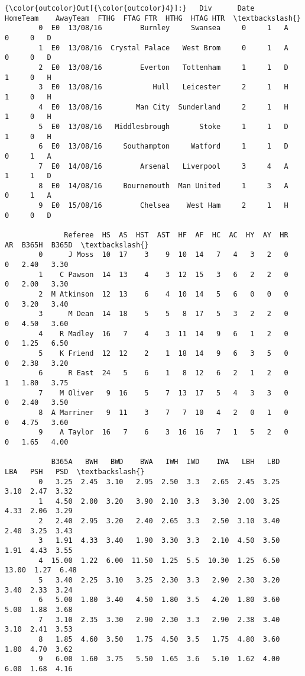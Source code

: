 \documentclass[11pt]{article}
\begin{document}
\begin{Verbatim}[commandchars=\\\{\}]
{\color{outcolor}Out[{\color{outcolor}4}]:}   Div      Date        HomeTeam    AwayTeam  FTHG  FTAG FTR  HTHG  HTAG HTR  \textbackslash{}
        0  E0  13/08/16         Burnley     Swansea     0     1   A     0     0   D   
        1  E0  13/08/16  Crystal Palace   West Brom     0     1   A     0     0   D   
        2  E0  13/08/16         Everton   Tottenham     1     1   D     1     0   H   
        3  E0  13/08/16            Hull   Leicester     2     1   H     1     0   H   
        4  E0  13/08/16        Man City  Sunderland     2     1   H     1     0   H   
        5  E0  13/08/16   Middlesbrough       Stoke     1     1   D     1     0   H   
        6  E0  13/08/16     Southampton     Watford     1     1   D     0     1   A   
        7  E0  14/08/16         Arsenal   Liverpool     3     4   A     1     1   D   
        8  E0  14/08/16     Bournemouth  Man United     1     3   A     0     1   A   
        9  E0  15/08/16         Chelsea    West Ham     2     1   H     0     0   D   
        
              Referee  HS  AS  HST  AST  HF  AF  HC  AC  HY  AY  HR  AR  B365H  B365D  \textbackslash{}
        0      J Moss  10  17    3    9  10  14   7   4   3   2   0   0   2.40   3.30   
        1    C Pawson  14  13    4    3  12  15   3   6   2   2   0   0   2.00   3.30   
        2  M Atkinson  12  13    6    4  10  14   5   6   0   0   0   0   3.20   3.40   
        3      M Dean  14  18    5    5   8  17   5   3   2   2   0   0   4.50   3.60   
        4    R Madley  16   7    4    3  11  14   9   6   1   2   0   0   1.25   6.50   
        5    K Friend  12  12    2    1  18  14   9   6   3   5   0   0   2.38   3.20   
        6      R East  24   5    6    1   8  12   6   2   1   2   0   1   1.80   3.75   
        7    M Oliver   9  16    5    7  13  17   5   4   3   3   0   0   2.40   3.50   
        8  A Marriner   9  11    3    7   7  10   4   2   0   1   0   0   4.75   3.60   
        9    A Taylor  16   7    6    3  16  16   7   1   5   2   0   0   1.65   4.00   
        
           B365A   BWH   BWD    BWA   IWH  IWD    IWA   LBH   LBD    LBA   PSH   PSD  \textbackslash{}
        0   3.25  2.45  3.10   2.95  2.50  3.3   2.65  2.45  3.25   3.10  2.47  3.32   
        1   4.50  2.00  3.20   3.90  2.10  3.3   3.30  2.00  3.25   4.33  2.06  3.29   
        2   2.40  2.95  3.20   2.40  2.65  3.3   2.50  3.10  3.40   2.40  3.25  3.43   
        3   1.91  4.33  3.40   1.90  3.30  3.3   2.10  4.50  3.50   1.91  4.43  3.55   
        4  15.00  1.22  6.00  11.50  1.25  5.5  10.30  1.25  6.50  13.00  1.27  6.48   
        5   3.40  2.25  3.10   3.25  2.30  3.3   2.90  2.30  3.20   3.40  2.33  3.24   
        6   5.00  1.80  3.40   4.50  1.80  3.5   4.20  1.80  3.60   5.00  1.88  3.68   
        7   3.10  2.35  3.30   2.90  2.30  3.3   2.90  2.38  3.40   3.10  2.41  3.53   
        8   1.85  4.60  3.50   1.75  4.50  3.5   1.75  4.80  3.60   1.80  4.70  3.62   
        9   6.00  1.60  3.75   5.50  1.65  3.6   5.10  1.62  4.00   6.00  1.68  4.16   
        

\end{Verbatim}
\end{document}
